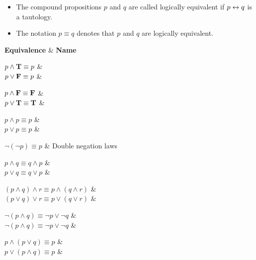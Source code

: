 \pagebreak

    \begin{itemize}
      \item The compound propositions $p$ and $q$ are called logically
      equivalent if $p \leftrightarrow q$ is a tautology.
      \item The notation $p \equiv q$ denotes that $p$ and $q$ are
      logically equivalent.
    \end{itemize}

      \hline
      \textbf{Equivalence} & \textbf{Name} \\
      \hline

      $p \land \mathbf{T} \equiv p$ &  \\
      $p \lor \mathbf{F} \equiv p$ & \\
      \hline

      $p \land \mathbf{F} \equiv \mathbf{F}$ &  \\
      $p \lor \mathbf{T} \equiv \mathbf{T}$ & \\
      \hline

      $p \land p \equiv p$ &  \\
      $p \lor p \equiv p$ & \\
      \hline

      $\lnot (\lnot p) \equiv p$ & Double negation laws \\
      \hline

      $p \land q \equiv q \land p$ &  \\
      $p \lor q \equiv q \lor p$ & \\
      \hline

      $(p \land q) \land r \equiv p \land (q \land r)$
        &  \\
      $(p \lor q) \lor r \equiv p \lor (q \lor r)$ & \\
      \hline

      $\lnot (p \land q) \equiv \lnot p \lor \lnot q$
        &  \\
      $\lnot (p \land q) \equiv \lnot p \lor \lnot q$ & \\
      \hline

      $p \land (p \lor q) \equiv p$
        &  \\
      $p \lor (p \land q) \equiv p$ & \\
      \hline

